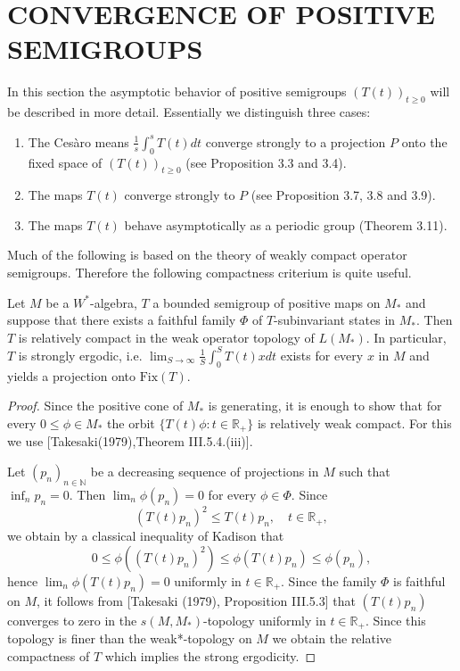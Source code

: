 \section{CONVERGENCE OF POSITIVE SEMIGROUPS}\label{sec:d4-3}

In this section the asymptotic behavior of positive semigroups $(T(t))_{t \geq 0}$ will be described in more detail.
Essentially we distinguish three cases:

\begin{enumerate}[(1)]
\item
The Cesàro means $\frac{1}{s}\int_{0}^{s} T(t)dt$ converge strongly to a projection $P$ onto the fixed space of $(T(t))_{t \geq 0}$ (see Proposition 3.3 and 3.4).

\item
The maps $T(t)$ converge strongly to $P$ (see Proposition 3.7, 3.8 and 3.9).

\item
The maps $T(t)$ behave asymptotically as a periodic group (Theorem 3.11).
\end{enumerate}

Much of the following is based on the theory of weakly compact operator semigroups.
Therefore the following compactness criterium is quite useful.

\begin{proposition}\label{prop:d4-3-1}
Let $M$ be a $W^*$-algebra, $T$ a bounded semigroup of positive maps on $M_{*}$ and suppose that there exists a faithful family $\Phi$ of $T$-subinvariant states in $M_{*}$.
Then $T$ is relatively compact in the weak operator topology of $L(M_{*})$.
In particular, $T$ is strongly ergodic, i.e. $\lim_{S \to \infty} \frac{1}{S}\int_{0}^{S} T(t)xdt$ exists for every $x$ in $M$ and yields a projection onto $\text{Fix}(T)$.
\end{proposition}

\begin{proof}
Since the positive cone of $M_{*}$ is generating, it is enough to show that for every $0 \leq \phi \in M_{*}$ the orbit $\{T(t)\phi : t \in \mathbb{R}_{+}\}$ is relatively weak compact.
For this we use [Takesaki(1979),Theorem III.5.4.(iii)].


\newpage

Let $(p_{n})_{n \in \mathbb{N}}$ be a decreasing sequence of projections in $M$ such that $\inf_{n} p_{n} = 0$.
Then $\lim_{n}\phi(p_{n}) = 0$ for every $\phi \in \Phi$.
Since
\[
(T(t)p_{n})^2 \leq T(t)p_{n}, \quad t \in \mathbb{R}_{+},
\]
we obtain by a classical inequality of Kadison that
\[
0 \leq \phi((T(t)p_{n})^2) \leq \phi(T(t)p_{n}) \leq \phi(p_{n}),
\]
hence $\lim_{n}\phi(T(t)p_{n}) = 0$ uniformly in $t \in \mathbb{R}_{+}$.
Since the family $\Phi$ is faithful on $M$, it follows from [Takesaki (1979), Proposition III.5.3] that $(T(t)p_{n})$ converges to zero in the $s(M,M_{*})$-topology uniformly in $t \in \mathbb{R}_{+}$.
Since this topology is finer than the weak*-topology on $M$ we obtain the relative compactness of $T$ which implies the strong ergodicity.
\end{proof}

